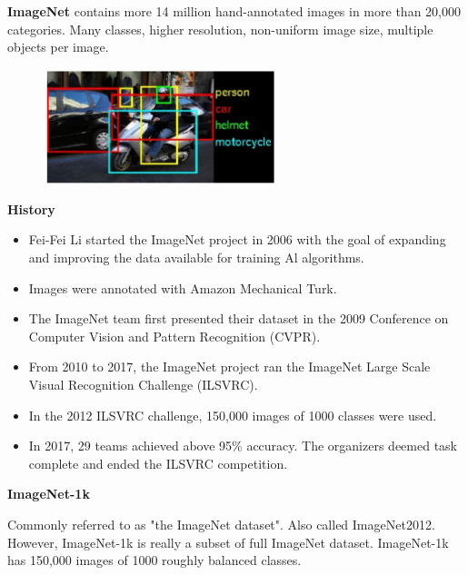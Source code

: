 \documentclass{report}
\begin{document}
\begin{definition}
    \textbf{ImageNet} contains more 14 million hand-annotated images in more than 20,000 categories.
    Many classes, higher resolution, non-uniform image size, multiple objects per image.

    \begin{figure}[H]
        \centering
        \includegraphics[width=0.6\textwidth]{.././assets/7.1.jpg}
    \end{figure}

    \par\noindent\textcolor{gray}{\hdashrule{\textwidth}{0.4pt}{1pt 2pt}}

    \textbf{History}

    \begin{itemize}
        \item Fei-Fei Li started the ImageNet project in 2006 with the goal of expanding and improving the data available for training Al algorithms.
        \item Images were annotated with Amazon Mechanical Turk.
        \item The ImageNet team first presented their dataset in the 2009 Conference on Computer Vision and Pattern Recognition (CVPR).
        \item From 2010 to 2017, the ImageNet project ran the ImageNet Large Scale Visual Recognition Challenge (ILSVRC).
        \item In the 2012 ILSVRC challenge, 150,000 images of 1000 classes were used.
        \item In 2017, 29 teams achieved above 95\% accuracy. The organizers deemed task complete and ended the ILSVRC competition.
    \end{itemize}

    \par\noindent\textcolor{gray}{\hdashrule{\textwidth}{0.4pt}{1pt 2pt}}

    \textbf{ImageNet-1k}

    Commonly referred to as "the ImageNet dataset". Also called ImageNet2012.
    However, ImageNet-1k is really a subset of full ImageNet dataset.
    ImageNet-1k has 150,000 images of 1000 roughly balanced classes.


\end{definition}
\end{document}
